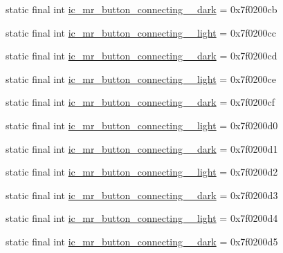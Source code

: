 \begin{CompactItemize}
\item 
static final int \hyperlink{classandroid_1_1support_1_1v7_1_1mediarouter_1_1_r_1_1drawable_7b749ad96bb48f2841e4774984f60e4a}{ic\_\-mr\_\-button\_\-connecting\_\_\-dark} = 0x7f0200cb
\item 
static final int \hyperlink{classandroid_1_1support_1_1v7_1_1mediarouter_1_1_r_1_1drawable_46bad96dd9dfb3b49926ce7676480499}{ic\_\-mr\_\-button\_\-connecting\_\_\-light} = 0x7f0200cc
\item 
static final int \hyperlink{classandroid_1_1support_1_1v7_1_1mediarouter_1_1_r_1_1drawable_4e1a90e5daae65239532bff99c63ccca}{ic\_\-mr\_\-button\_\-connecting\_\_\-dark} = 0x7f0200cd
\item 
static final int \hyperlink{classandroid_1_1support_1_1v7_1_1mediarouter_1_1_r_1_1drawable_c7e1a82dbe6a302f3f4d943fefac0f06}{ic\_\-mr\_\-button\_\-connecting\_\_\-light} = 0x7f0200ce
\item 
static final int \hyperlink{classandroid_1_1support_1_1v7_1_1mediarouter_1_1_r_1_1drawable_57ca18f3d351aa403fc963b3f538ac7e}{ic\_\-mr\_\-button\_\-connecting\_\_\-dark} = 0x7f0200cf
\item 
static final int \hyperlink{classandroid_1_1support_1_1v7_1_1mediarouter_1_1_r_1_1drawable_b4d53fb7329ed791c422b545ea52fbcb}{ic\_\-mr\_\-button\_\-connecting\_\_\-light} = 0x7f0200d0
\item 
static final int \hyperlink{classandroid_1_1support_1_1v7_1_1mediarouter_1_1_r_1_1drawable_65afd2123368d28b8df327da2e763e3e}{ic\_\-mr\_\-button\_\-connecting\_\_\-dark} = 0x7f0200d1
\item 
static final int \hyperlink{classandroid_1_1support_1_1v7_1_1mediarouter_1_1_r_1_1drawable_750b43db64d21ca7f2e38c35febcb887}{ic\_\-mr\_\-button\_\-connecting\_\_\-light} = 0x7f0200d2
\item 
static final int \hyperlink{classandroid_1_1support_1_1v7_1_1mediarouter_1_1_r_1_1drawable_8a1e9fa19b394af7de917b5c4dfd872f}{ic\_\-mr\_\-button\_\-connecting\_\_\-dark} = 0x7f0200d3
\item 
static final int \hyperlink{classandroid_1_1support_1_1v7_1_1mediarouter_1_1_r_1_1drawable_413076f8cd98f35c38b67c4169fde8db}{ic\_\-mr\_\-button\_\-connecting\_\_\-light} = 0x7f0200d4
\item 
static final int \hyperlink{classandroid_1_1support_1_1v7_1_1mediarouter_1_1_r_1_1drawable_9b0d27287e848571936b84ed49fdc75d}{ic\_\-mr\_\-button\_\-connecting\_\_\-dark} = 0x7f0200d5
\item 

\end{CompactItemize}

